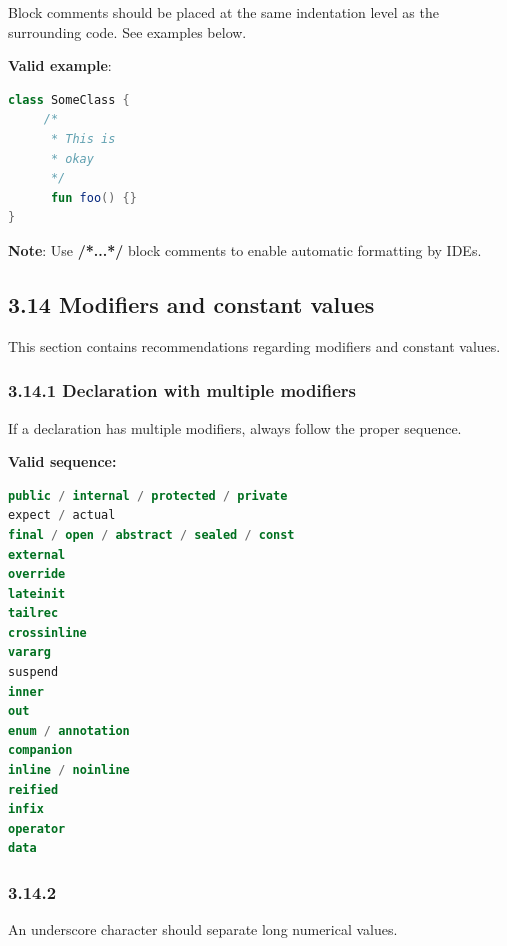 {{{{{{{{{{{{{{{{{{{{Block comments should be placed at the same indentation level as the surrounding code. See examples below.



\textbf{Valid example}:



\begin{lstlisting}[language=Kotlin]
class SomeClass {
     /*
      * This is
      * okay
      */
      fun foo() {}
}
\end{lstlisting}


\textbf{Note}: Use \textbf{/*...*/} block comments to enable automatic formatting by IDEs.



\subsection*{\textbf{3.14 Modifiers and constant values}}

\label{sec:3.14}

This section contains recommendations regarding modifiers and constant values.

\subsubsection*{\textbf{3.14.1 Declaration with multiple modifiers}}
\leavevmode\newline

\label{sec:3.14.1}

If a declaration has multiple modifiers, always follow the proper sequence.

\textbf{Valid sequence:}



\begin{lstlisting}[language=Kotlin]
public / internal / protected / private
expect / actual
final / open / abstract / sealed / const
external
override
lateinit
tailrec
crossinline
vararg
suspend
inner
out
enum / annotation
companion
inline / noinline
reified
infix
operator
data
\end{lstlisting}


\subsubsection*{\textbf{3.14.2}}
\leavevmode\newline

\label{sec:3.14.2}

An underscore character should separate long numerical values.

}}}}}}}}}}}}}}}}}}}}
